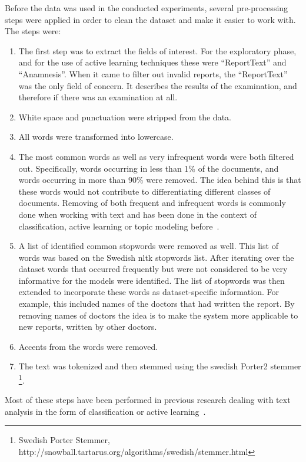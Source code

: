 Before the data was used in the conducted experiments, several pre-processing steps were applied in order to clean the dataset and make it easier to work with.
The steps were:
\begin{enumerate}
    \item The first step was to extract the fields of interest.
          For the exploratory phase, and for the use of active learning techniques these were ``ReportText'' and ``Anamnesis''.
          When it came to filter out invalid reports, the ``ReportText'' was the only field of concern.
          It describes the results of the examination, and therefore if there was an examination at all.
    \item White space and punctuation were stripped from the data.
    \item All words were transformed into lowercase.
    \item The most common words as well as very infrequent words were both filtered out.
          Specifically, words occurring in less than 1\% of the documents, and words occurring in more than 90\% were removed.
          The idea behind this is that these words would not contribute to differentiating different classes of documents.
          Removing of both frequent and infrequent words is commonly done when working with text and has been done in the context of classification, active learning or topic modeling before~\cite{tong2001support, blei2003latent, brinker2006active, sarioglu2013topic}.
    \item A list of identified common stopwords were removed as well.
          This list of words was based on the Swedish nltk stopwords list.
          After iterating over the dataset words that occurred frequently but were not considered to be very informative for the models were identified.
          The list of stopwords was then extended to incorporate these words as dataset-specific information.
          For example, this included names of the doctors that had written the report.
          By removing names of doctors the idea is to make the system more applicable to new reports, written by other doctors.
    \item Accents from the words were removed.
    \item The text was tokenized and then stemmed using the swedish Porter2 stemmer \footnote{Swedish Porter Stemmer, http://snowball.tartarus.org/algorithms/swedish/stemmer.html}.
\end{enumerate}
Most of these steps have been performed in previous research  dealing with text analysis in the form of classification or active learning~\cite{tong2001support, blei2003latent, brinker2006active, sarioglu2013topic}.

